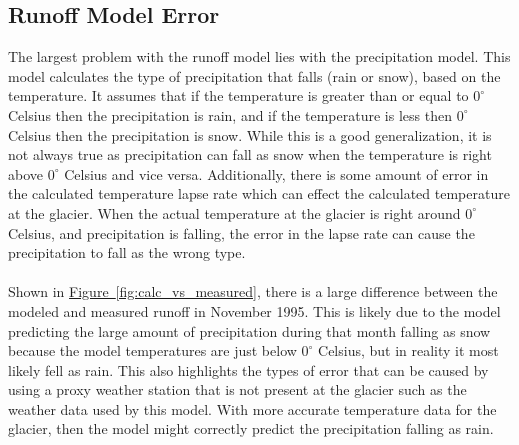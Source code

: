 \documentclass{article}
\begin{document}
\subsection{Runoff Model Error}
The largest problem with the runoff model lies with the precipitation model. This model calculates the type of precipitation that falls (rain or 
snow), based on the temperature. It assumes that if the temperature is greater than or equal to $0^\circ$ Celsius then the precipitation is rain, and if the 
temperature is less then $0^\circ$ Celsius then the precipitation is snow. While this is a good generalization, it is not always true as precipitation 
can fall as snow when the temperature is right above $0^\circ$ Celsius and vice versa. 
Additionally, there is some amount of error in the calculated temperature lapse rate which 
can effect the calculated temperature at the glacier. When the actual temperature at the glacier is right around $0^\circ$ Celsius, and precipitation is falling, 
the error in the lapse rate can cause the precipitation to fall as the wrong type. 
\paragraph{}
Shown in \hyperref[fig:calc_vs_measured]{Figure~\ref*{fig:calc_vs_measured}}, there is a large difference between the modeled and measured runoff in November 1995. 
This is likely due to the model predicting the large amount of precipitation 
during that month falling as snow because the model temperatures are just below $0^\circ$ Celsius, but in reality it most likely fell as rain. This also 
highlights the types of error that can be caused by using a proxy weather station that is not present at the glacier such as the weather data used by this model. With 
more accurate temperature data for the glacier, then the model might correctly predict the precipitation falling as rain. 
\end{document}
